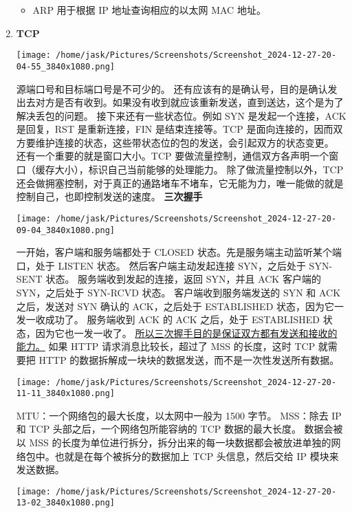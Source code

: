 \documentclass[11pt]{article}
\begin{document}
\begin{enumerate}
\begin{itemize}
\item ARP 用于根据 IP 地址查询相应的以太网 MAC 地址。
\end{itemize}
\item \textbf{TCP}
\begin{center}
\texttt{[image: /home/jask/Pictures/Screenshots/Screenshot\_2024-12-27-20-04-55\_3840x1080.png]}
\end{center}
源端口号和目标端口号是不可少的。
还有应该有的是确认号，目的是确认发出去对方是否有收到。如果没有收到就应该重新发送，直到送达，这个是为了解决丢包的问题。
接下来还有一些状态位。例如 SYN 是发起一个连接，ACK 是回复，RST 是重新连接，FIN 是结束连接等。TCP 是面向连接的，因而双方要维护连接的状态，这些带状态位的包的发送，会引起双方的状态变更。
还有一个重要的就是窗口大小。TCP 要做流量控制，通信双方各声明一个窗口（缓存大小），标识自己当前能够的处理能力。
除了做流量控制以外，TCP还会做拥塞控制，对于真正的通路堵车不堵车，它无能为力，唯一能做的就是控制自己，也即控制发送的速度。
\textbf{三次握手}
\begin{center}
\texttt{[image: /home/jask/Pictures/Screenshots/Screenshot\_2024-12-27-20-09-04\_3840x1080.png]}
\end{center}
一开始，客户端和服务端都处于 CLOSED 状态。先是服务端主动监听某个端口，处于 LISTEN 状态。
然后客户端主动发起连接 SYN，之后处于 SYN-SENT 状态。
服务端收到发起的连接，返回 SYN，并且 ACK 客户端的 SYN，之后处于 SYN-RCVD 状态。
客户端收到服务端发送的 SYN 和 ACK 之后，发送对 SYN 确认的 ACK，之后处于 ESTABLISHED 状态，因为它一发一收成功了。
服务端收到 ACK 的 ACK 之后，处于 ESTABLISHED 状态，因为它也一发一收了。
\uline{所以三次握手目的是保证双方都有发送和接收的能力。}
如果 HTTP 请求消息比较长，超过了 MSS 的长度，这时 TCP 就需要把 HTTP 的数据拆解成一块块的数据发送，而不是一次性发送所有数据。
\begin{center}
\texttt{[image: /home/jask/Pictures/Screenshots/Screenshot\_2024-12-27-20-11-11\_3840x1080.png]}
\end{center}
MTU：一个网络包的最大长度，以太网中一般为 1500 字节。
MSS：除去 IP 和 TCP 头部之后，一个网络包所能容纳的 TCP 数据的最大长度。
数据会被以 MSS 的长度为单位进行拆分，拆分出来的每一块数据都会被放进单独的网络包中。也就是在每个被拆分的数据加上 TCP 头信息，然后交给 IP 模块来发送数据。
\begin{center}
\texttt{[image: /home/jask/Pictures/Screenshots/Screenshot\_2024-12-27-20-13-02\_3840x1080.png]}
\end{center}
\begin{center}

\end{center}
\end{enumerate}
\end{document}
